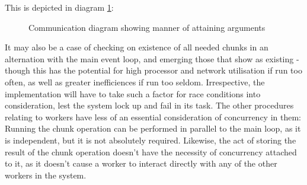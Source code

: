 This is depicted in diagram \ref{fig:argument-attain}:

\begin{figure}
  \centering
  
  \caption{Communication diagram showing manner of attaining arguments}
  \label{fig:argument-attain}
\end{figure}

It may also be a case of checking on existence of all needed chunks in
an alternation with the main event loop, and emerging those that show as
existing - though this has the potential for high processor and network
utilisation if run too often, as well as greater inefficiences if run
too seldom. Irrespective, the implementation will have to take such a
factor for race conditions into consideration, lest the system lock up
and fail in its task. The other procedures relating to workers have less
of an essential consideration of concurrency in them: Running the chunk
operation can be performed in parallel to the main loop, as it is
independent, but it is not absolutely required. Likewise, the act of
storing the result of the chunk operation doesn't have the necessity of
concurrency attached to it, as it doesn't cause a worker to interact
directly with any of the other workers in the system.